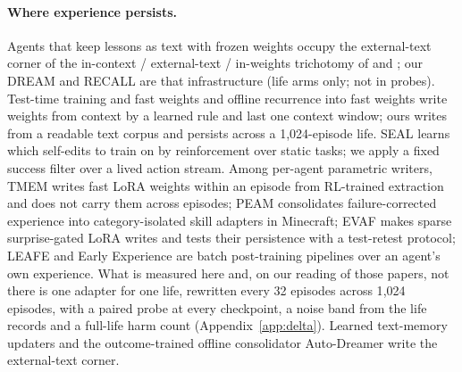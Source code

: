\documentclass{article}
\begin{document}
\paragraph{Where experience persists.} Agents that keep lessons as text with frozen weights \citep{shinn2023reflexion,park2023generative,packer2023memgpt,wang2023voyager,zhao2023expel,xu2025amem,zhang2026memskill} occupy the external-text corner of the in-context / external-text / in-weights trichotomy of \citet{dorovatas2026modular} and \citet{back2026lora}; our DREAM and RECALL are that infrastructure (life arms only; not in probes). Test-time training and fast weights \citep{sun2024ttt,behrouz2024titans} and offline recurrence into fast weights \citep{lee2026sleep} write weights from context by a learned rule and last one context window; ours writes from a readable text corpus and persists across a 1{,}024-episode life. SEAL \citep{zweiger2025seal} learns which self-edits to train on by reinforcement over static tasks; we apply a fixed success filter over a lived action stream. Among per-agent parametric writers, TMEM \citep{ren2026tmem} writes fast LoRA weights within an episode from RL-trained extraction and does not carry them across episodes; PEAM \citep{guo2026peam} consolidates failure-corrected experience into category-isolated skill adapters in Minecraft; EVAF \citep{han2026evaf} makes sparse surprise-gated LoRA writes and tests their persistence with a test-retest protocol; LEAFE \citep{ge2026leafe} and Early Experience \citep{zhang2025earlyexperience} are batch post-training pipelines over an agent's own experience. What is measured here and, on our reading of those papers, not there is one adapter for one life, rewritten every 32 episodes across 1{,}024 episodes, with a paired probe at every checkpoint, a noise band from the life records and a full-life harm count (Appendix~\ref{app:delta}). Learned text-memory updaters \citep{cai2026memopilot,tablan2026learningjob} and the outcome-trained offline consolidator Auto-Dreamer \citep{ye2026autodreamer} write the external-text corner.
\end{document}
